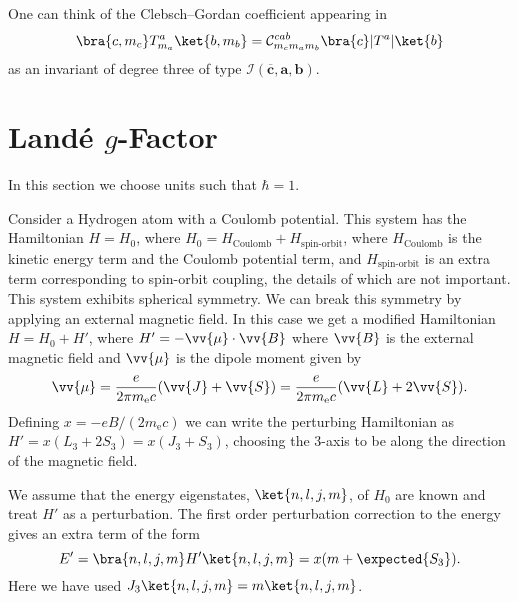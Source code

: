 \documentclass[fleqn]{NotesClass}
\newcommand*{\rep}[1]{\mathbf{#1}}
\newcommand*{\clebschgordan}[6]{\mathcal{C}_{#1#2#3}^{#4#5#6}}
\begin{document}
    One can think of the Clebsch--Gordan coefficient appearing in
    \begin{equation}
        \bra{c, m_c} T_{m_a}^a \ket{b, m_b} = \clebschgordan{m_c}{m_a}{m_b}{c}{a}{b} \bra{c} |T^a| \ket{b}
    \end{equation}
    as an invariant of degree three of type \(\mathcal{I}(\overline{\rep{c}}, \rep{a}, \rep{b})\).
    
    \section{Land\'e \texorpdfstring{\(g\)}{g}-Factor}
    \begin{wrn}
        In this section we choose units such that \(\hbar = 1\).
    \end{wrn}
    Consider a Hydrogen atom with a Coulomb potential.
    This system has the Hamiltonian \(H = H_0\), where \(H_0 = H_{\mathrm{Coulomb}} + H_{\text{spin-orbit}}\), where \(H_{\mathrm{Coulomb}}\) is the kinetic energy term and the Coulomb potential term, and \(H_{\text{spin-orbit}}\) is an extra term corresponding to spin-orbit coupling, the details of which are not important.
    This system exhibits spherical symmetry.
    We can break this symmetry by applying an external magnetic field.
    In this case we get a modified Hamiltonian \(H = H_0 + H'\), where \(H' = -\vv{\mu} \cdot \vv{B}\) where \(\vv{B}\) is the external magnetic field and \(\vv{\mu}\) is the dipole moment given by
    \begin{equation}
        \vv{\mu} = \frac{e}{2\pi m_{\mathrm{e}} c} (\vv{J} + \vv{S}) = \frac{e}{2\pi m_{\mathrm{e}} c} (\vv{L} + 2\vv{S}).
    \end{equation}
    Defining \(x = -eB/(2m_{\mathrm{e}} c)\) we can write the perturbing Hamiltonian as \(H' = x(L_3 + 2S_3) = x(J_3 + S_3)\), choosing the \(3\)-axis to be along the direction of the magnetic field.
    
    We assume that the energy eigenstates, \(\ket{n, l, j, m}\), of \(H_0\) are known and treat \(H'\) as a perturbation.
    The first order perturbation correction to the energy gives an extra term of the form
    \begin{equation}
        E' = \bra{n, l, j, m} H' \ket{n, l, j, m} = x(m + \expected{S_3}).
    \end{equation}
    Here we have used \(J_3\ket{n, l, j, m} = m\ket{n, l, j, m}\).
    
\end{document}
